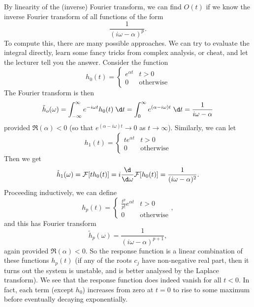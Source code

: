 \documentclass[a4paper]{article}
\begin{document}
By linearity of the (inverse) Fourier transform, we can find $O(t)$ if we know the inverse Fourier transform of all functions of the form
\[
  \frac{1}{(i\omega - \alpha)^p}.
\]
To compute this, there are many possible approaches. We can try to evaluate the integral directly, learn some fancy tricks from complex analysis, or cheat, and let the lecturer tell you the answer. Consider the function
\[
  h_0(t) =
  \begin{cases}
    e^{\alpha t} & t > 0\\
    0 & \text{otherwise}
  \end{cases}
\]
The Fourier transform is then
\[
  \tilde{h}_o(\omega) = \int_{-\infty}^\infty e^{-i\omega t} h_0(t) \;\d t = \int_0^\infty e^{(\alpha - i \omega)t} \;\d t = \frac{1}{i\omega - \alpha}
\]
provided $\Re(\alpha) < 0$ (so that $e^{(\alpha - i\omega) t} \to 0$ as $t \to \infty$). Similarly, we can let
\[
  h_1(t) =
  \begin{cases}
    te^{\alpha t} & t > 0\\
    0 & \text{otherwise}
  \end{cases}
\]
Then we get
\[
  \tilde{h}_1(\omega) = \mathcal{F}[t h_0(t)] = i\frac{\d}{\d \omega} \mathcal{F}[h_0(t)] = \frac{1}{(i \omega - \alpha)^2}.
\]
Proceeding inductively, we can define
\[
  h_p(t) =
  \begin{cases}
    \frac{t^p}{p!} e^{\alpha t} & t > 0\\
    0 & \text{otherwise}
  \end{cases},
\]
and this has Fourier transform
\[
  \tilde{h}_p (\omega) = \frac{1}{(i \omega - \alpha)^{p + 1}},
\]
again provided $\Re(\alpha) < 0$. So the response function is a linear combination of these functions $h_p(t)$ (if any of the roots $c_j$ have non-negative real part, then it turns out the system is unstable, and is better analysed by the Laplace transform). We see that the response function does indeed vanish for all $t < 0$. In fact, each term (except $h_0$) increases from zero at $t = 0$ to rise to some maximum before eventually decaying exponentially.
\end{document}
